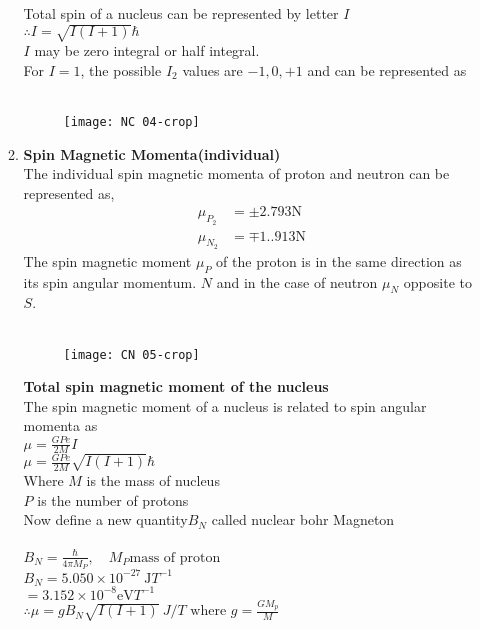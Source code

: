 \begin{enumerate}
\begin{enumerate}
Total spin of a nucleus can be represented by letter $I$\\
$\therefore I=\sqrt{I(I+1)}\hbar$\\
$I$ may be zero integral or half integral.\\
 For $I=1$, the possible $I_2$ values are $-1,0,+1$ and can be represented as \\\\
\begin{figure}[H]
	\centering
	\texttt{[image: NC 04-crop]}
	\caption{}
	\label{}
\end{figure}
	\item \textbf{Spin Magnetic Momenta(individual)}\\
	 The individual spin magnetic momenta of proton and neutron can be represented as,\\
	\begin{align*}
	\mu_{P_{2}}&=\pm 2.793 \mathrm{N}\\
	\mu_{N_{2}}&=\mp 1..913 \mathrm{N}
	\end{align*}
	The spin magnetic moment $\mu_P$ of the proton is in the same direction as its spin angular momentum. $N$ and in the case of neutron $\mu_{N}$ opposite to $S$.\\\\
	\begin{figure}[H]
		\centering
		\texttt{[image: CN 05-crop]}
		\caption{}
		\label{}
	\end{figure}
\textbf{Total spin magnetic moment of the nucleus}\\
The spin magnetic moment of a nucleus is related to spin angular momenta as\\ $\mu=\frac{GPe}{2M}I$\\
$\mu=\frac{GPe}{2M}\sqrt{I(I+1)}\hbar$\\
Where
$M$ is the mass of nucleus\\
$P$ is the number of protons \\
Now define a new quantity$B_N$ called nuclear bohr Magneton\\\\
$B_N=\frac{\hbar}{4\pi M_P},\quad M_P \text{mass of proton}$\\
$B_{N}=5.050 \times 10^{-2 7} \mathrm{~J}{T}^{-1}$\\
$=3.152 \times 10^{-8} \mathrm{eV} T^{-1}$\\
$\therefore \mu=g B_{N} \sqrt{I(I+1)} \ J / T \text{ where } g=\frac{G M_p}{M}$\\

\end{enumerate}
\end{enumerate}

